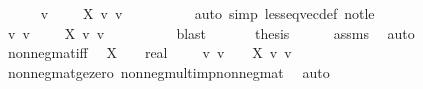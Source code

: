 \begin{isabellebody}
\ \ \ \ \isamarkupfalse%
\ {\isachardoublequoteopen}{\isacharquery}{\kern0pt}v\ {\isasymge}\ {}\ {\isasymand}\ {\isasymnot}\ {\isacharparenleft}{\kern0pt}{\isacharparenleft}{\kern0pt}X\ {\isacharasterisk}{\kern0pt}v\ {\isacharquery}{\kern0pt}v{\isacharparenright}{\kern0pt}\ {\isasymge}\ {}{\isacharparenright}{\kern0pt}{\isachardoublequoteclose}\isanewline
\ \ \ \ \ \ \isamarkupfalse%
\ {\isacharparenleft}{\kern0pt}auto\ simp{\isacharcolon}{\kern0pt}\ less{\isacharunderscore}{\kern0pt}eq{\isacharunderscore}{\kern0pt}vec{\isacharunderscore}{\kern0pt}def\ not{\isacharunderscore}{\kern0pt}le{\isacharparenright}{\kern0pt}\isanewline
\ \ \ \ \isamarkupfalse%
\ {\isachardoublequoteopen}{\isasymexists}v{\isachardot}{\kern0pt}\ v\ {\isasymge}\ {}\ {\isasymand}\ {\isasymnot}\ X\ {\isacharasterisk}{\kern0pt}v\ v\ {\isasymge}\ {}{\isachardoublequoteclose}\isanewline
\ \ \ \ \ \ \isamarkupfalse%
\ blast\isanewline
\ \ \isacommand{{\isacharbraceright}{\kern0pt}}\isamarkupfalse%
\isanewline
\ \ \isamarkupfalse%
\ {\isacharquery}{\kern0pt}thesis\isanewline
\ \ \ \ \isamarkupfalse%
\ assms\ \isamarkupfalse%
\ auto\isanewline
{}\isamarkupfalse%
%
\endisatagproof
{\isafoldproof}%
%
\isadelimproof
\isanewline
%
\endisadelimproof
\isanewline
{}\isamarkupfalse%
\ nonneg{\isacharunderscore}{\kern0pt}mat{\isacharunderscore}{\kern0pt}iff{\isacharcolon}{\kern0pt}\isanewline
\ \ {\isachardoublequoteopen}{\isacharparenleft}{\kern0pt}X\ {\isasymge}\ {\isacharparenleft}{\kern0pt}{}\ {\isacharcolon}{\kern0pt}{\isacharcolon}{\kern0pt}\ real\ {\isacharcircum}{\kern0pt}\ {\isacharunderscore}{\kern0pt}\ {\isacharcircum}{\kern0pt}{\isacharunderscore}{\kern0pt}{\isacharparenright}{\kern0pt}{\isacharparenright}{\kern0pt}\ {\isasymlongleftrightarrow}\ {\isacharparenleft}{\kern0pt}{\isasymforall}v{\isachardot}{\kern0pt}\ v\ {\isasymge}\ {}\ {\isasymlongrightarrow}\ X\ {\isacharasterisk}{\kern0pt}v\ v\ {\isasymge}\ {}{\isacharparenright}{\kern0pt}{\isachardoublequoteclose}\isanewline
%
\isadelimproof
\ \ %
\endisadelimproof
%
\isatagproof
{}\isamarkupfalse%
\ nonneg{\isacharunderscore}{\kern0pt}mat{\isacharunderscore}{\kern0pt}ge{\isacharunderscore}{\kern0pt}zero\ nonneg{\isacharunderscore}{\kern0pt}mult{\isacharunderscore}{\kern0pt}imp{\isacharunderscore}{\kern0pt}nonneg{\isacharunderscore}{\kern0pt}mat\ \isamarkupfalse%
\ auto%
\endisatagproof

\end{isabellebody}
